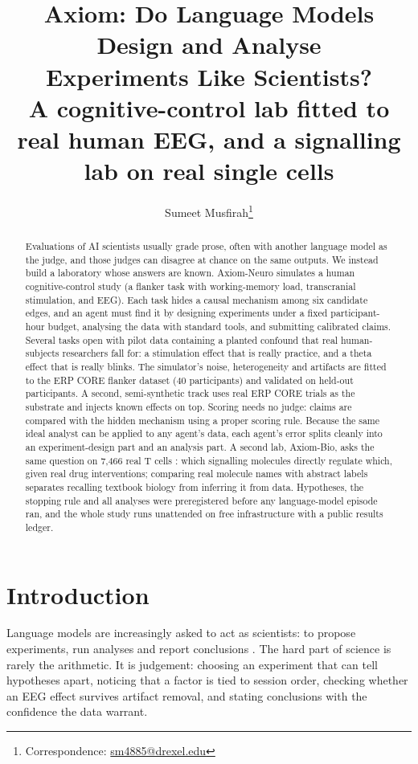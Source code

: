 \documentclass[11pt]{article}
\title{\textbf{Axiom: Do Language Models Design and Analyse\\Experiments Like Scientists?}\\[4pt]
\large A cognitive-control lab fitted to real human EEG, and a signalling lab on real single cells}
\author{Sumeet Musfirah\thanks{Correspondence: \href{mailto:sm4885@drexel.edu}{sm4885@drexel.edu}}}
\affil{Drexel University, Philadelphia, PA, USA}
\date{}
\begin{document}
\maketitle

\begin{abstract}
Evaluations of AI scientists usually grade prose, often with another language model as the judge, and those judges can disagree at chance on the same outputs.
We instead build a laboratory whose answers are known.
Axiom-Neuro simulates a human cognitive-control study (a flanker task with working-memory load, transcranial stimulation, and EEG).
Each task hides a causal mechanism among six candidate edges, and an agent must find it by designing experiments under a fixed participant-hour budget, analysing the data with standard tools, and submitting calibrated claims.
Several tasks open with pilot data containing a planted confound that real human-subjects researchers fall for: a stimulation effect that is really practice, and a theta effect that is really blinks.
The simulator's noise, heterogeneity and artifacts are fitted to the ERP CORE flanker dataset (40 participants) and validated on held-out participants.
A second, semi-synthetic track uses real ERP CORE trials as the substrate and injects known effects on top.
Scoring needs no judge: claims are compared with the hidden mechanism using a proper scoring rule.
Because the same ideal analyst can be applied to any agent's data, each agent's error splits cleanly into an experiment-design part and an analysis part.
A second lab, Axiom-Bio, asks the same question on 7{,}466 real T cells \citep{sachs2005causal}: which signalling molecules directly regulate which, given real drug interventions; comparing real molecule names with abstract labels separates recalling textbook biology from inferring it from data.
Hypotheses, the stopping rule and all analyses were preregistered before any language-model episode ran, and the whole study runs unattended on free infrastructure with a public results ledger.
\resultsStatus
\end{abstract}

\section{Introduction}
Language models are increasingly asked to act as scientists: to propose experiments, run analyses and report conclusions \citep{jansen2024discoveryworld,gandhi2025boxinggym,chen2025scienceagentbench}.
The hard part of science is rarely the arithmetic.
It is judgement: choosing an experiment that can tell hypotheses apart, noticing that a factor is tied to session order, checking whether an EEG effect survives artifact removal, and stating conclusions with the confidence the data warrant.
\end{document}
